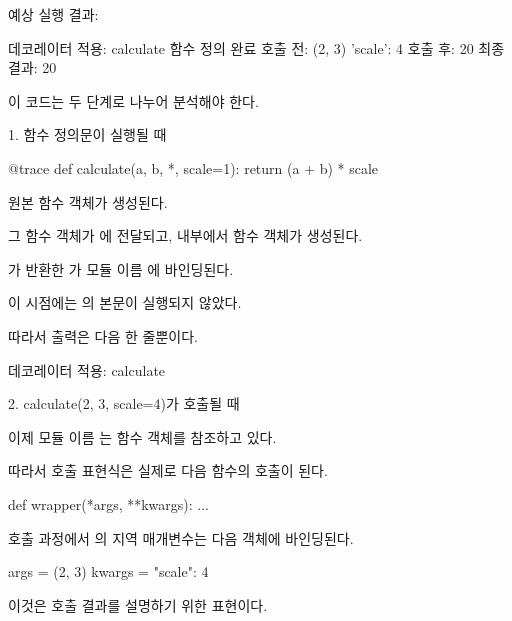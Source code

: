 예상 실행 결과:

\begin{dhkzsh}
데코레이터 적용: calculate
함수 정의 완료
호출 전: (2, 3) {'scale': 4}
호출 후: 20
최종 결과: 20
\end{dhkzsh}

이 코드는 두 단계로 나누어 분석해야 한다.

\begin{dhknote}
\begin{dhksmry}[centered]
1. 함수 정의문이 실행될 때
\end{dhksmry}
\end{dhknote}

\begin{dhkcode}
@trace
def calculate(a, b, *, scale=1):
    return (a + b) * scale
\end{dhkcode}

원본  함수 객체가 생성된다.

그 함수 객체가 에 전달되고,  내부에서  함수 객체가 생성된다.

가 반환한 가 모듈 이름 에 바인딩된다.

이 시점에는 의 본문이 실행되지 않았다.

따라서 출력은 다음 한 줄뿐이다.

\begin{dhkzsh}
데코레이터 적용: calculate
\end{dhkzsh}

\begin{dhknote}
\begin{dhksmry}[centered]
2. calculate(2, 3, scale=4)가 호출될 때
\end{dhksmry}
\end{dhknote}

이제 모듈 이름 는  함수 객체를 참조하고 있다.

따라서 호출 표현식은 실제로 다음 함수의 호출이 된다.

\begin{dhkcode}
def wrapper(*args, **kwargs):
    ...
\end{dhkcode}

호출 과정에서 의 지역 매개변수는 다음 객체에 바인딩된다.

\begin{dhkzsh}
args = (2, 3)
kwargs = {"scale": 4}
\end{dhkzsh}

이것은 호출 결과를 설명하기 위한 표현이다.

